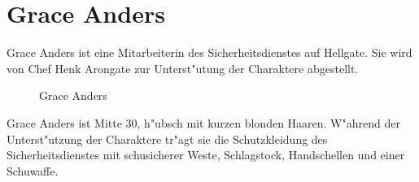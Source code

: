 \newpage
\section{Grace Anders}

Grace Anders ist eine Mitarbeiterin des Sicherheitsdienstes auf Hellgate. Sie wird von Chef Henk Arongate zur Unterst"utung der Charaktere abgestellt. 

\begin{figure}
    \caption{Grace Anders}
\end{figure}

Grace Anders ist Mitte 30, h"ubsch mit kurzen blonden Haaren. W"ahrend der Unterst"utzung der Charaktere tr"agt sie die Schutzkleidung des Sicherheitsdienstes mit schu\3sicherer Weste, Schlagstock, Handschellen und einer Schu\3waffe. 

